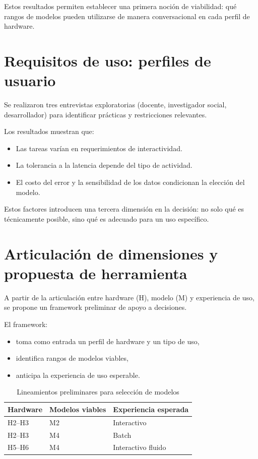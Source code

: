 \documentclass{llncs}
\begin{document}
Estos resultados permiten establecer una primera noción de viabilidad: qué rangos de modelos pueden utilizarse de manera conversacional en cada perfil de hardware.

\section{Requisitos de uso: perfiles de usuario}\label{usuarios}

Se realizaron tres entrevistas exploratorias (docente, investigador social, desarrollador) para identificar prácticas y restricciones relevantes.

Los resultados muestran que:

\begin{itemize}
    \item Las tareas varían en requerimientos de interactividad.
    \item La tolerancia a la latencia depende del tipo de actividad.
    \item El costo del error y la sensibilidad de los datos condicionan la elección del modelo.
\end{itemize}

Estos factores introducen una tercera dimensión en la decisión: no solo qué es técnicamente posible, sino qué es adecuado para un uso específico.

\section{Articulación de dimensiones y propuesta de herramienta}\label{framework}

A partir de la articulación entre hardware (H), modelo (M) y experiencia de uso, se propone un framework preliminar de apoyo a decisiones.

El framework:
\begin{itemize}
    \item toma como entrada un perfil de hardware y un tipo de uso,
    \item identifica rangos de modelos viables,
    \item anticipa la experiencia de uso esperable.
\end{itemize}

\begin{table}[htbp]
\centering
\caption{Lineamientos preliminares para selección de modelos}
\begin{tabular}{|l|l|l|}
\hline
Hardware & Modelos viables & Experiencia esperada \\
\hline
H2–H3 & M2 & Interactivo \\
\hline
H2–H3 & M4 & Batch \\
\hline
H5–H6 & M4 & Interactivo fluido \\
\hline
\end{tabular}
\end{table}
\end{document}
